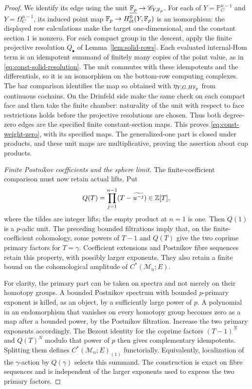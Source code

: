 \begin{proof}
We identify its edge using the unit
$\underline{\mathbb F_p}\to\mathscr C_{Y,\mathbb F_p}$.  For each of
$Y=\mathbb P_C^{n-1}$ and $Y=\Omega_C^{n-1}$, its induced point map
$\mathbb F_p\to H^0_{\mathrm{\acute et}}(Y,\mathbb F_p)$ is an isomorphism: the
displayed row calculations make the target one-dimensional, and the
constant section $1$ is nonzero.  For each compact group in the
descent, apply the finite projective resolution $Q_\bullet$ of
Lemma~\ref{lem:solid-rows}.  Each evaluated internal-Hom term is an
idempotent summand of finitely many copies of the point value, as in
\eqref{eq:const-solid-resolution}.  The unit commutes with these
idempotents and the differentials, so it is an isomorphism on the
bottom-row computing complexes.  The bar comparison identifies the
map so obtained with $\eta_{Y,G,H\mathbb F_p}$ from continuous cochains.  On
the Drinfeld side make the same check on each compact face and then
take the finite chamber: naturality of the unit with respect to face
restrictions holds before the projective resolutions are chosen.
Thus both degree-zero edges are the specified finite constant-section
maps.  This proves \eqref{eq:const-weight-zero}, with its specified
maps.  The generalized-one part is closed under products, and these
unit maps are multiplicative, proving the assertion about cup products.

\emph{Finite Postnikov coefficients and the sphere limit.}
The finite-coefficient comparison must now retain actual lifts.
Put
\[
 Q(T)=\prod_{j=1}^{n-1}(T-\widetilde{u^{-j}})\in\mathbb Z[T],
\]
where the tildes are integer lifts; the empty product at $n=1$ is one.
Then $Q(1)$ is a $p$-adic unit.  The preceding bounded filtrations imply
that, on the finite-coefficient cohomology, some powers of $T-1$ and
$Q(T)$ give the two coprime primary factors for $T=\gamma$.
Coefficient extensions and Postnikov fibre sequences retain this
property, with possibly larger exponents.  They also retain a finite
bound on the cohomological amplitude of $C^*(\mathcal M_n;E)$.

For clarity, the primary part can be taken on spectra and not merely on
their homotopy groups.  A bounded Postnikov spectrum with bounded
$p$-primary exponent is killed, as an object, by a sufficiently large
power of $p$.  A polynomial in an endomorphism that vanishes on every
homotopy group becomes zero as a map after a bounded power, by the
Postnikov filtration.  Increase the two primary exponents accordingly.
The Bezout identity for the coprime factors $(T-1)^N$ and $Q(T)^N$
modulo that power of $p$ then gives complementary idempotents.  Splitting
them defines $C^*(\mathcal M_n;E)_{(1)}$ functorially.  Equivalently,
localization of the $\gamma$-action by $Q(\gamma)$ selects this summand.
The construction is exact on fibre sequences and is independent of the
larger exponents used to express the two primary factors.


\end{proof}
